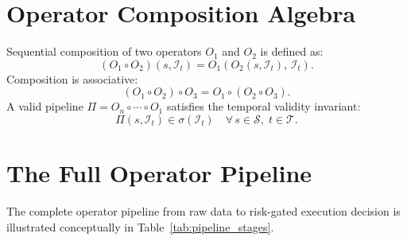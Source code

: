 \documentclass[12pt,openany]{book}
\numberwithin{equation}{chapter}
\theoremstyle{plain}
\theoremstyle{definition}
\theoremstyle{remark}
\begin{document}
\section{Operator Composition Algebra}

Sequential composition of two operators $O_1$ and $O_2$ is defined as:
\begin{equation}
    (O_1 \circ O_2)(s, \mathcal{I}_t) = O_1\!\left(O_2(s, \mathcal{I}_t),\, \mathcal{I}_t\right).
\end{equation}
Composition is associative:
\begin{equation}
    (O_1 \circ O_2) \circ O_3 = O_1 \circ (O_2 \circ O_3).
\end{equation}
A valid pipeline $\Pi = O_n \circ \cdots \circ O_1$ satisfies the
temporal validity invariant:
\begin{equation}
    \Pi(s, \mathcal{I}_t) \in \sigma(\mathcal{I}_t) \quad \forall\, s \in \mathcal{S},\; t \in \mathcal{T}.
\end{equation}

\section{The Full Operator Pipeline}

The complete operator pipeline from raw data to risk-gated execution
decision is illustrated conceptually in Table~\ref{tab:pipeline_stages}.
\end{document}
